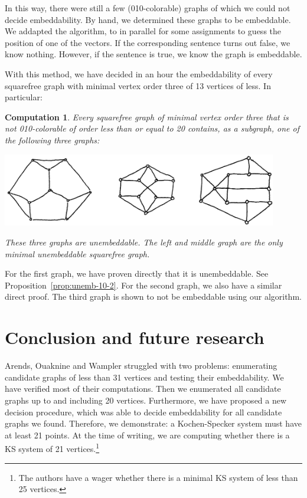 \documentclass[a4paper]{article}
\newcounter{main}
\newtheorem{comp}[main]{Computation}
\theoremstyle{definition}
\theoremstyle{remark}
\begin{document}
In this way, there were still a few (010-colorable) graphs of which
we could not decide embeddability.
By hand, we determined these graphs to be embeddable.
We addapted the algorithm, to in parallel for some assignments
to guess the position of one of the vectors.  If the corresponding
sentence turns out false, we know nothing.  However,
if the sentence is true, we know the graph is embeddable.

With this method, we have decided in an hour the embeddability
of every squarefree graph with minimal vertex order three of 13
vertices of less.
In particular:
\begin{comp}\label{comp:unemb20}
    Every squarefree graph of minimal vertex order three
    that is not 010-colorable
    of order less than or equal to 20
    contains, as a subgraph, one of the following three graphs:
    \begin{center}
        \includegraphics[width=120mm]{graphs/unemb-base-20.jpg}
    \end{center}
    These three graphs are unembeddable.  The left and middle graph
    are the only minimal unembeddable squarefree graph.
\end{comp}
For the first graph, we have proven directly that it is unembeddable.
See Proposition~\ref{prop:unemb-10-2}.
For the second graph, we also have a similar direct proof. The third graph is shown to not be embeddable using our algorithm.

\section{Conclusion and future research}
Arends, Ouaknine and Wampler struggled with two problems:
enumerating candidate graphs of less than 31 vertices
and testing their embeddability.
We have verified most of their computations.
Then we enumerated all candidate graphs
up to and including 20 vertices.
Furthermore, we have proposed a new decision procedure,
which was able to decide embeddability
for all candidate graphs we found.
Therefore, we demonstrate: a Kochen-Specker system must have at least
21 points.
At the time of writing,
we are computing
whether there is a KS system of 21 vertices.\footnote{
The authors have a wager whether there is a minimal KS system of less
than 25 vertices.}
\end{document}
